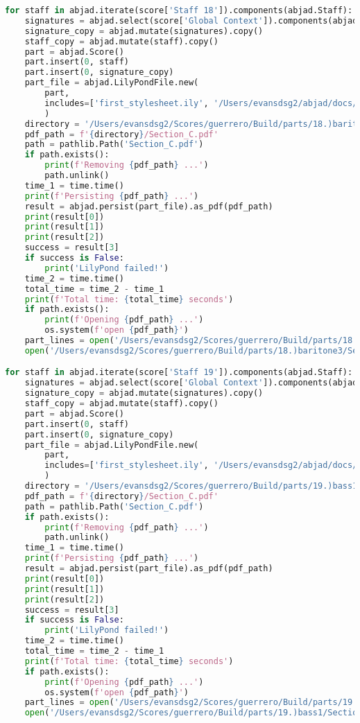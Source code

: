 \begin{lstlisting}[language=Python, caption=Invocation Source Code]
for staff in abjad.iterate(score['Staff 18']).components(abjad.Staff):
    signatures = abjad.select(score['Global Context']).components(abjad.Staff)
    signature_copy = abjad.mutate(signatures).copy()
    staff_copy = abjad.mutate(staff).copy()
    part = abjad.Score()
    part.insert(0, staff)
    part.insert(0, signature_copy)
    part_file = abjad.LilyPondFile.new(
        part,
        includes=['first_stylesheet.ily', '/Users/evansdsg2/abjad/docs/source/_stylesheets/abjad.ily'],
        )
    directory = '/Users/evansdsg2/Scores/guerrero/Build/parts/18.)baritone3'
    pdf_path = f'{directory}/Section_C.pdf'
    path = pathlib.Path('Section_C.pdf')
    if path.exists():
        print(f'Removing {pdf_path} ...')
        path.unlink()
    time_1 = time.time()
    print(f'Persisting {pdf_path} ...')
    result = abjad.persist(part_file).as_pdf(pdf_path)
    print(result[0])
    print(result[1])
    print(result[2])
    success = result[3]
    if success is False:
        print('LilyPond failed!')
    time_2 = time.time()
    total_time = time_2 - time_1
    print(f'Total time: {total_time} seconds')
    if path.exists():
        print(f'Opening {pdf_path} ...')
        os.system(f'open {pdf_path}')
    part_lines = open('/Users/evansdsg2/Scores/guerrero/Build/parts/18.)baritone3/Section_C.ly').readlines()
    open('/Users/evansdsg2/Scores/guerrero/Build/parts/18.)baritone3/Section_C.ly', 'w').writelines(part_lines[15:-1])

for staff in abjad.iterate(score['Staff 19']).components(abjad.Staff):
    signatures = abjad.select(score['Global Context']).components(abjad.Staff)
    signature_copy = abjad.mutate(signatures).copy()
    staff_copy = abjad.mutate(staff).copy()
    part = abjad.Score()
    part.insert(0, staff)
    part.insert(0, signature_copy)
    part_file = abjad.LilyPondFile.new(
        part,
        includes=['first_stylesheet.ily', '/Users/evansdsg2/abjad/docs/source/_stylesheets/abjad.ily'],
        )
    directory = '/Users/evansdsg2/Scores/guerrero/Build/parts/19.)bass1'
    pdf_path = f'{directory}/Section_C.pdf'
    path = pathlib.Path('Section_C.pdf')
    if path.exists():
        print(f'Removing {pdf_path} ...')
        path.unlink()
    time_1 = time.time()
    print(f'Persisting {pdf_path} ...')
    result = abjad.persist(part_file).as_pdf(pdf_path)
    print(result[0])
    print(result[1])
    print(result[2])
    success = result[3]
    if success is False:
        print('LilyPond failed!')
    time_2 = time.time()
    total_time = time_2 - time_1
    print(f'Total time: {total_time} seconds')
    if path.exists():
        print(f'Opening {pdf_path} ...')
        os.system(f'open {pdf_path}')
    part_lines = open('/Users/evansdsg2/Scores/guerrero/Build/parts/19.)bass1/Section_C.ly').readlines()
    open('/Users/evansdsg2/Scores/guerrero/Build/parts/19.)bass1/Section_C.ly', 'w').writelines(part_lines[15:-1])


\end{lstlisting}
